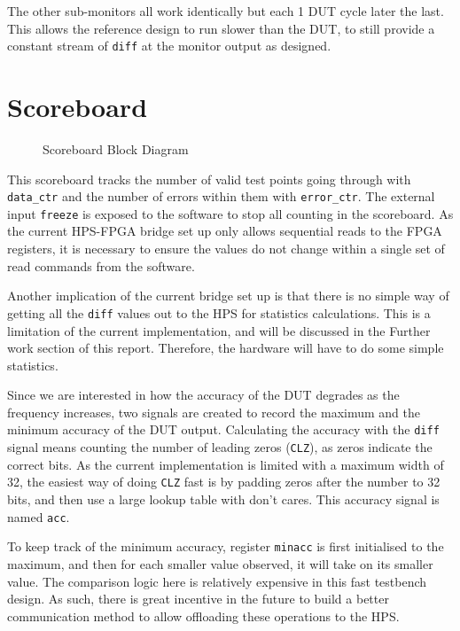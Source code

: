 The other sub-monitors all work identically but each 1 DUT cycle later the last.
This allows the reference design to run slower than the DUT, to still provide a constant stream of \texttt{diff} at the monitor output as designed.

\section{Scoreboard}

\begin{figure}[H]
  \centering
  
  \caption{Scoreboard Block Diagram}
  \label{ScoreboardBlk}
\end{figure}

This scoreboard tracks the number of valid test points going through with \texttt{data\_ctr} and the number of errors within them with \texttt{error\_ctr}.
The external input \texttt{freeze} is exposed to the software to stop all counting in the scoreboard.
As the current HPS-FPGA bridge set up only allows sequential reads to the FPGA registers, it is necessary to ensure the values do not change within a single set of read commands from the software.

Another implication of the current bridge set up is that there is no simple way of getting all the \texttt{diff} values out to the HPS for statistics calculations.
This is a limitation of the current implementation, and will be discussed in the Further work section of this report.
Therefore, the hardware will have to do some simple statistics.

Since we are interested in how the accuracy of the DUT degrades as the frequency increases, two signals are created to record the maximum and the minimum accuracy of the DUT output.
Calculating the accuracy with the \texttt{diff} signal means counting the number of leading zeros (\texttt{CLZ}), as zeros indicate the correct bits.
As the current implementation is limited with a maximum width of 32, the easiest way of doing \texttt{CLZ} fast is by padding zeros after the number to 32 bits, and then use a large lookup table with don't cares.
This accuracy signal is named \texttt{acc}.

To keep track of the minimum accuracy, register \texttt{minacc} is first initialised to the maximum, and then for each smaller value observed, it will take on its smaller value.
The comparison logic here is relatively expensive in this fast testbench design.
As such, there is great incentive in the future to build a better communication method to allow offloading these operations to the HPS.

